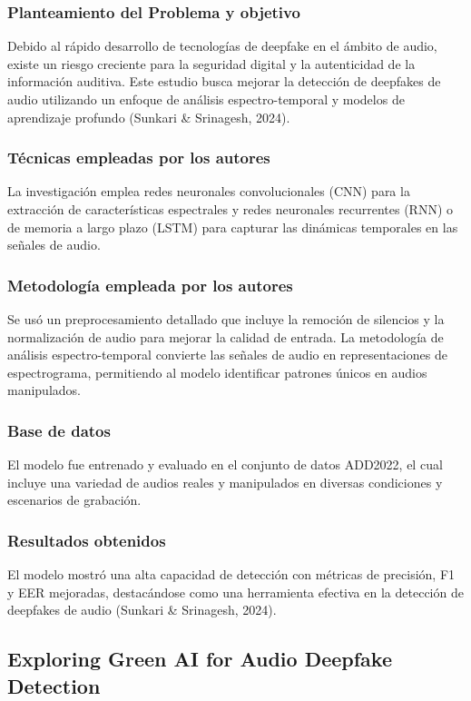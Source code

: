 \subsubsection{Planteamiento del Problema y objetivo }
Debido al rápido desarrollo de tecnologías de deepfake en el ámbito de audio, existe un riesgo creciente para la seguridad digital y la autenticidad de la información auditiva. Este estudio busca mejorar la detección de deepfakes de audio utilizando un enfoque de análisis espectro-temporal y modelos de aprendizaje profundo (Sunkari \& Srinagesh, 2024).

\subsubsection{Técnicas empleadas por los autores}
La investigación emplea redes neuronales convolucionales (CNN) para la extracción de características espectrales y redes neuronales recurrentes (RNN) o de memoria a largo plazo (LSTM) para capturar las dinámicas temporales en las señales de audio.

\subsubsection{Metodología empleada por los autores}
Se usó un preprocesamiento detallado que incluye la remoción de silencios y la normalización de audio para mejorar la calidad de entrada. La metodología de análisis espectro-temporal convierte las señales de audio en representaciones de espectrograma, permitiendo al modelo identificar patrones únicos en audios manipulados.

\subsubsection{Base de datos}
El modelo fue entrenado y evaluado en el conjunto de datos ADD2022, el cual incluye una variedad de audios reales y manipulados en diversas condiciones y escenarios de grabación.

\subsubsection{Resultados obtenidos}
El modelo mostró una alta capacidad de detección con métricas de precisión, F1 y EER mejoradas, destacándose como una herramienta efectiva en la detección de deepfakes de audio (Sunkari \& Srinagesh, 2024).

\subsection{Exploring Green AI for Audio Deepfake Detection \citep*{saha2024greenai}}

